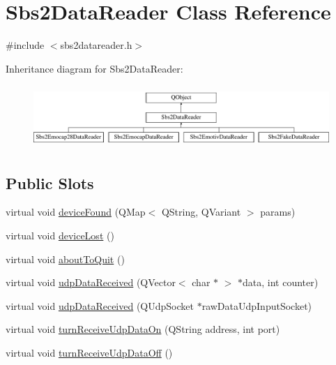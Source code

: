 \hypertarget{classSbs2DataReader}{\section{Sbs2\-Data\-Reader Class Reference}
\label{classSbs2DataReader}
}


{\ttfamily \#include $<$sbs2datareader.\-h$>$}

Inheritance diagram for Sbs2\-Data\-Reader\-:\begin{figure}[H]
\begin{center}
\leavevmode
\includegraphics[height=2.413793cm]{classSbs2DataReader}
\end{center}
\end{figure}
\subsection*{Public Slots}
\begin{DoxyCompactItemize}
\item 
virtual void \hyperlink{classSbs2DataReader_adf247d12bc7a9d4ec368c10a6516ee27}{device\-Found} (Q\-Map$<$ Q\-String, Q\-Variant $>$ params)
\item 
virtual void \hyperlink{classSbs2DataReader_a2dd9b209ae967396d82c041b7ea1e494}{device\-Lost} ()
\item 
virtual void \hyperlink{classSbs2DataReader_a1990beb8bea474d074befc259afaf7ed}{about\-To\-Quit} ()
\item 
virtual void \hyperlink{classSbs2DataReader_a2d96f5fd9a29c92799db5ab41ba80bf8}{udp\-Data\-Received} (Q\-Vector$<$ char $\ast$ $>$ $\ast$data, int counter)
\item 
virtual void \hyperlink{classSbs2DataReader_a29d2eea990fe1da78e5f83c34ef2bb84}{udp\-Data\-Received} (Q\-Udp\-Socket $\ast$raw\-Data\-Udp\-Input\-Socket)
\item 
virtual void \hyperlink{classSbs2DataReader_a3dab2a116c2bd5e594ab6f2044d03713}{turn\-Receive\-Udp\-Data\-On} (Q\-String address, int port)
\item 
virtual void \hyperlink{classSbs2DataReader_af30ede5dbff8dd3101bc6a7553d1c2cf}{turn\-Receive\-Udp\-Data\-Off} ()
\end{DoxyCompactItemize}
